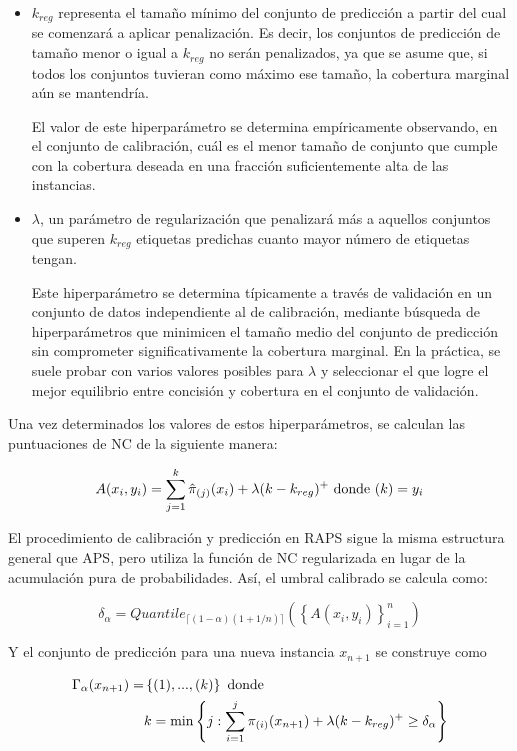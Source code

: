 \begin{itemize}

    \item $k_{reg}$ representa el tamaño mínimo del conjunto de predicción a partir del cual se comenzará a aplicar penalización. Es decir, los conjuntos de predicción de tamaño menor o igual a $k_{reg}$ no serán penalizados, ya que se asume que, si todos los conjuntos tuvieran como máximo ese tamaño, la cobertura marginal aún se mantendría. 
    
    El valor de este hiperparámetro se determina empíricamente observando, en el conjunto de calibración, cuál es el menor tamaño de conjunto que cumple con la cobertura deseada en una fracción suficientemente alta de las instancias. 
   
    \item $\lambda$, un parámetro de regularización que penalizará más a aquellos conjuntos que superen $k_{reg}$ etiquetas predichas cuanto mayor número de etiquetas tengan. 

    Este hiperparámetro se determina típicamente a través de validación en un conjunto de datos independiente al de calibración, mediante búsqueda de hiperparámetros que minimicen el tamaño medio del conjunto de predicción sin comprometer significativamente la cobertura marginal. En la práctica, se suele probar con varios valores posibles para $\lambda$ y seleccionar el que logre el mejor equilibrio entre concisión y cobertura en el conjunto de validación.

\end{itemize}

Una vez determinados los valores de estos hiperparámetros, se calculan las puntuaciones de \acrshort{NC} de la siguiente manera:

$$
A(x_i, y_i) = \sum_{j=1}^k \hat{\pi}_{(j)}(x_i) + \lambda (k-k_{reg})^+ \textnormal{ donde } (k) = y_i
$$

El procedimiento de calibración y predicción en \acrshort{RAPS} sigue la misma estructura general que \acrshort{APS}, pero utiliza la función de \acrshort{NC} regularizada en lugar de la acumulación pura de probabilidades. Así, el umbral calibrado se calcula como:

$$
\delta_\alpha = Quantile_{ \lceil  (1-\alpha) (1 + 1/n)  \rceil } \left( \left\{ A(x_i,y_i) \right\}_{i=1}^n \right)
$$

Y el conjunto de predicción para una nueva instancia $x_{n+1}$ se construye como

\begin{align*} 
\Gamma_\alpha(x_{n+1})= &\left\{ (1), ..., (k) \right\} \textnormal{ donde }\\
& k = \min \left\{ j: \sum_{i=1}^{j} \pi_{(i)}(x_{n+1}) + \lambda (k-k_{reg})^+  \ge \delta_\alpha \right\}
\end{align*}

